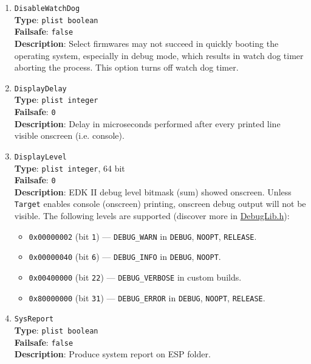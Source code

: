 \documentclass[]{article}
\providecommand{\tightlist}{%
  \setlength{\itemsep}{0pt}\setlength{\parskip}{0pt}}
\begin{document}
\begin{enumerate}
\item
  \texttt{DisableWatchDog}\\
  \textbf{Type}: \texttt{plist\ boolean}\\
  \textbf{Failsafe}: \texttt{false}\\
  \textbf{Description}: Select firmwares may not succeed in quickly booting
  the operating system, especially in debug mode, which results in watch dog
  timer aborting the process. This option turns off watch dog timer.

\item
  \texttt{DisplayDelay}\\
  \textbf{Type}: \texttt{plist\ integer}\\
  \textbf{Failsafe}: \texttt{0}\\
  \textbf{Description}: Delay in microseconds performed after
  every printed line visible onscreen (i.e. console).

\item
  \texttt{DisplayLevel}\\
  \textbf{Type}: \texttt{plist\ integer}, 64 bit\\
  \textbf{Failsafe}: \texttt{0}\\
  \textbf{Description}: EDK II debug level bitmask (sum) showed onscreen.
  Unless \texttt{Target} enables console (onscreen) printing,
  onscreen debug output will not be visible. The following levels
  are supported (discover more in
  \href{https://github.com/acidanthera/audk/blob/master/MdePkg/Include/Library/DebugLib.h}{DebugLib.h}):

  \begin{itemize}
  \tightlist
    \item \texttt{0x00000002} (bit \texttt{1}) --- \texttt{DEBUG\_WARN} in \texttt{DEBUG},
      \texttt{NOOPT}, \texttt{RELEASE}.
    \item \texttt{0x00000040} (bit \texttt{6}) --- \texttt{DEBUG\_INFO} in \texttt{DEBUG},
      \texttt{NOOPT}.
    \item \texttt{0x00400000} (bit \texttt{22}) --- \texttt{DEBUG\_VERBOSE} in custom builds.
    \item \texttt{0x80000000} (bit \texttt{31}) --- \texttt{DEBUG\_ERROR} in \texttt{DEBUG},
      \texttt{NOOPT}, \texttt{RELEASE}.
  \end{itemize}

\item
  \texttt{SysReport}\\
  \textbf{Type}: \texttt{plist\ boolean}\\
  \textbf{Failsafe}: \texttt{false}\\
  \textbf{Description}: Produce system report on ESP folder.


\end{enumerate}
\end{document}
